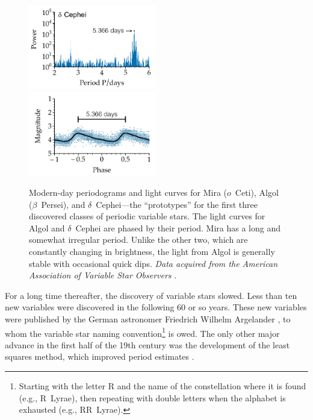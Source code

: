 \begin{figure}[p]
    \vspace*{0.4cm}
    \includegraphics[width=0.5\textwidth]{figs/pgrams/dcep_pgram.pdf}%
    \includegraphics[width=0.5\textwidth]{figs/pgrams/dcep_phased.pdf}\\%
    \vspace*{0.4cm}
    \caption[Light curves of the first-known periodic variable stars]{Modern-day periodograms and light curves for Mira ($o$~Ceti), Algol ($\beta$~Persei), and $\delta$~Cephei---the ``prototypes'' for the first three discovered classes of periodic variable stars. 
    The light curves for Algol and $\delta$~Cephei are phased by their period. 
    Mira has a long and somewhat irregular period. 
    Unlike the other two, which are constantly changing in brightness, the light from Algol is generally stable with occasional quick dips. 
    \emph{Data acquired from the American Association of Variable Star Observers} \citep[\textsc{AAVSO},][]{AAVSO}. 
    \label{fig:lightcurves}}
\end{figure}

For a long time thereafter, the discovery of variable stars slowed. 
Less than ten new variables were discovered in the following $60$ or so years. 
These new variables were published by the German astronomer Friedrich Wilhelm Argelander \citep{1844scja.book..122A}, to whom the variable star naming convention\footnote{ Starting with the letter R and the name of the constellation where it is found (e.g., R~Lyrae), then repeating with double letters when the alphabet is exhausted (e.g., RR~Lyrae).} is owed.
The only other major advance in the first half of the 19th century was the development of the least squares method, which improved period estimates \citep[e.g.,][]{1994JHA....25...92Z}. 

